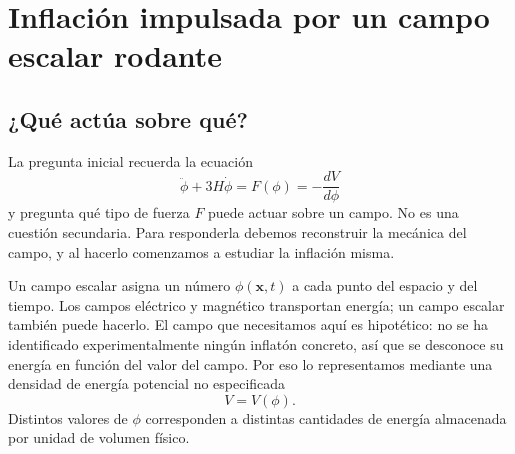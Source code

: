 \chapter{Inflación impulsada por un campo escalar rodante}


\section{¿Qué actúa sobre qué?}

La pregunta inicial recuerda la ecuación
\begin{equation}
\ddot\phi+3H\dot\phi
=F(\phi)
=-\frac{dV}{d\phi}
\label{eq:c09-opening}
\end{equation}
y pregunta qué tipo de fuerza \(F\) puede actuar sobre un campo. No es una cuestión secundaria. Para responderla debemos reconstruir la mecánica del campo, y al hacerlo comenzamos a estudiar la inflación misma.

Un campo escalar asigna un número \(\phi(\mathbf x,t)\) a cada punto del espacio y del tiempo. Los campos eléctrico y magnético transportan energía; un campo escalar también puede hacerlo. El campo que necesitamos aquí es hipotético: no se ha identificado experimentalmente ningún inflatón concreto, así que se desconoce su energía en función del valor del campo. Por eso lo representamos mediante una densidad de energía potencial no especificada
\begin{equation}
V=V(\phi).
\label{eq:c09-potential}
\end{equation}
Distintos valores de \(\phi\) corresponden a distintas cantidades de energía almacenada por unidad de volumen físico.

